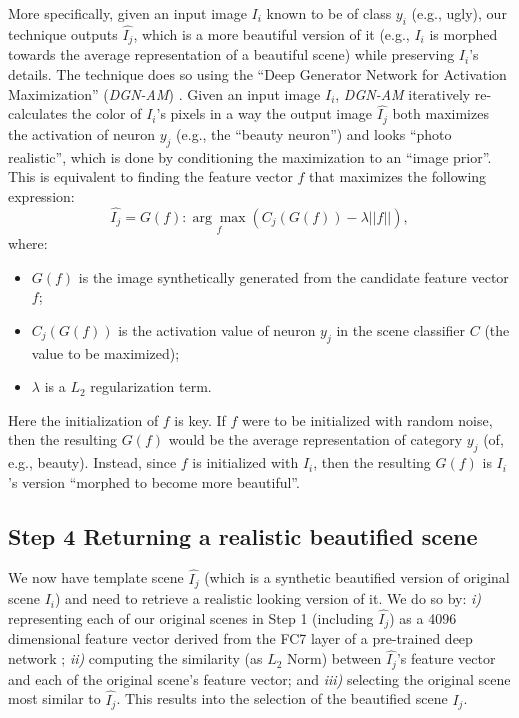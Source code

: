 More specifically, given an input image $I_i$ known to be of class $y_i$  (e.g., ugly), our technique outputs  $\hat{I_j}$, which is a  more beautiful version of it (e.g., $I_i$ is morphed  towards the average representation of a beautiful scene) while preserving $I_i$'s details. The technique does so using the ``Deep Generator Network for Activation Maximization'' (\emph{DGN-AM}) \cite{nguyen2016synthesizing}. Given an input image $I_i$, \emph{DGN-AM} iteratively re-calculates the color of $I_i$'s pixels in  a way  the output image $\hat{I_j}$  both maximizes  the  activation of neuron $y_j$ (e.g., the ``beauty neuron'') and looks ``photo realistic'',  which is done by conditioning the maximization to an ``image prior''. This is equivalent to finding the feature vector $f$ that maximizes the following expression:
\begin{equation}
\hat{I_j} =G( f ) : \underset{f}{\arg\max}(C_{j}(G(f))-\lambda||f||),
\end{equation}
where:
\begin{itemize}
\item $G(f)$ is the image synthetically generated from the candidate feature vector $f$;
\item $C_j(G(f))$ is the activation value of neuron $y_j$ in the scene classifier $C$ (the value to be maximized);
\item $\lambda$ is a $L_2$ regularization term.
\end{itemize}
Here the initialization of $f$ is key. If $f$ were to be initialized with random noise, then the resulting $G(f)$ would be the average representation of category $y_j$ (of, e.g., beauty). Instead, since $f$ is initialized with $I_i$, then the resulting $G(f)$ is $I_i$'s version ``morphed to become more beautiful''. 

\subsection*{Step 4 Returning a realistic beautified scene}
 We now have template scene $\hat{I_j}$ (which is a synthetic beautified version of original scene $I_i$) and need to retrieve a realistic looking version of it. We do so by: \emph{i)} representing each of our original scenes in Step 1 (including $\hat{I_j}$) as a 4096 dimensional feature vector derived from the FC7 layer of  a pre-trained deep  network \cite{zhou2014learning}; \emph{ii)} computing the similarity (as $L_2$ Norm) between $\hat{I_j}$'s feature vector and each of the original scene's feature vector; and \emph{iii)} selecting the original scene most similar to $\hat{I_j}$. This results into the selection of the beautified scene $I_j$.
 
